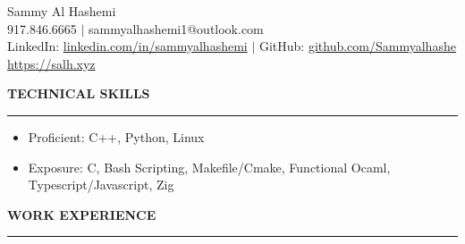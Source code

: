 \documentclass[12pt]{article}
\newcommand{\sectionRule}{\textcolor{gray}{\rule{7.27in}{0.02cm}}}
\newcommand{\sectionTxt}[1]{\noindent\textbf{#1}\\}
\begin{document}
    \begin{center}
        {\huge Sammy Al Hashemi}\\
        {\normalsize 917.846.6665 $|$ sammyalhashemi1@outlook.com}\\
        {\normalsize LinkedIn: \href{https://www.linkedin.com/in/sammyalhashemi}{linkedin.com/in/sammyalhashemi} $|$ GitHub: \href{https://github.com/Sammyalhashe}{github.com/Sammyalhashe}}\\
        {\normalsize \href{https://salh.xyz}{https://salh.xyz}}\\
    \end{center}
    \sectionTxt{TECHNICAL SKILLS}
    \sectionRule
    \begin{small}
        \begin{itemize}
            \itemsep0em 
            \item Proficient: {\color{textGray}C++, Python, Linux}
            \item Exposure: {\color{textGray}C, Bash Scripting, Makefile/Cmake, Functional Ocaml, Typescript/Javascript, Zig}
        \end{itemize}
    \end{small}
    \sectionTxt{WORK EXPERIENCE}
    \sectionRule
\end{document}
